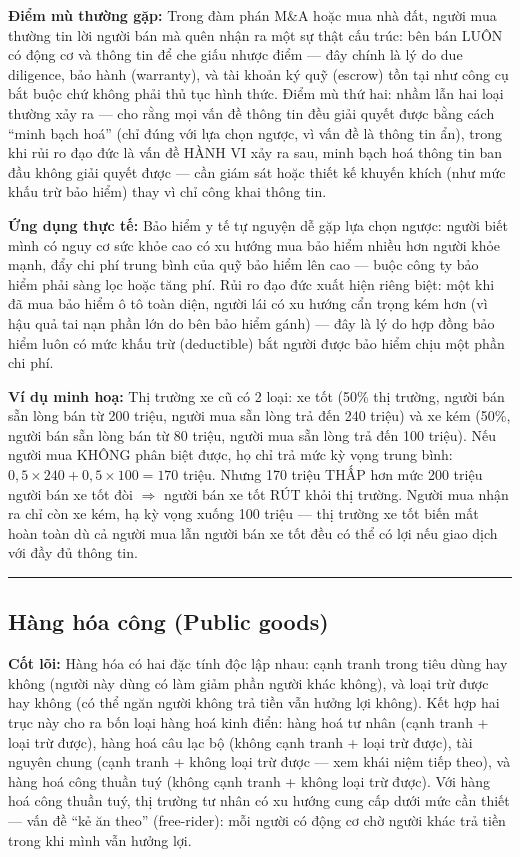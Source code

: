 \documentclass[
]{article}
\begin{document}
\textbf{Điểm mù thường gặp:} Trong đàm phán M\&A hoặc mua nhà đất, người
mua thường tin lời người bán mà quên nhận ra một sự thật cấu trúc: bên
bán LUÔN có động cơ và thông tin để che giấu nhược điểm --- đây chính là
lý do due diligence, bảo hành (warranty), và tài khoản ký quỹ (escrow)
tồn tại như công cụ bắt buộc chứ không phải thủ tục hình thức. Điểm mù
thứ hai: nhầm lẫn hai loại thường xảy ra --- cho rằng mọi vấn đề thông
tin đều giải quyết được bằng cách ``minh bạch hoá'' (chỉ đúng với lựa
chọn ngược, vì vấn đề là thông tin ẩn), trong khi rủi ro đạo đức là vấn
đề HÀNH VI xảy ra sau, minh bạch hoá thông tin ban đầu không giải quyết
được --- cần giám sát hoặc thiết kế khuyến khích (như mức khấu trừ bảo
hiểm) thay vì chỉ công khai thông tin.

\textbf{Ứng dụng thực tế:} Bảo hiểm y tế tự nguyện dễ gặp lựa chọn
ngược: người biết mình có nguy cơ sức khỏe cao có xu hướng mua bảo hiểm
nhiều hơn người khỏe mạnh, đẩy chi phí trung bình của quỹ bảo hiểm lên
cao --- buộc công ty bảo hiểm phải sàng lọc hoặc tăng phí. Rủi ro đạo
đức xuất hiện riêng biệt: một khi đã mua bảo hiểm ô tô toàn diện, người
lái có xu hướng cẩn trọng kém hơn (vì hậu quả tai nạn phần lớn do bên
bảo hiểm gánh) --- đây là lý do hợp đồng bảo hiểm luôn có mức khấu trừ
(deductible) bắt người được bảo hiểm chịu một phần chi phí.

\textbf{Ví dụ minh hoạ:} Thị trường xe cũ có 2 loại: xe tốt (50\% thị
trường, người bán sẵn lòng bán từ 200 triệu, người mua sẵn lòng trả đến
240 triệu) và xe kém (50\%, người bán sẵn lòng bán từ 80 triệu, người
mua sẵn lòng trả đến 100 triệu). Nếu người mua KHÔNG phân biệt được, họ
chỉ trả mức kỳ vọng trung bình:
\(0{,}5 \times 240 + 0{,}5 \times 100 = 170\) triệu. Nhưng 170 triệu
THẤP hơn mức 200 triệu người bán xe tốt đòi \(\Rightarrow\) người bán xe
tốt RÚT khỏi thị trường. Người mua nhận ra chỉ còn xe kém, hạ kỳ vọng
xuống 100 triệu --- thị trường xe tốt biến mất hoàn toàn dù cả người mua
lẫn người bán xe tốt đều có thể có lợi nếu giao dịch với đầy đủ thông
tin.

\begin{center}\rule{0.5\linewidth}{0.5pt}\end{center}

\subsection{Hàng hóa công (Public
goods)}\label{huxe0ng-huxf3a-cuxf4ng-public-goods}

\textbf{Cốt lõi:} Hàng hóa có hai đặc tính độc lập nhau: cạnh tranh
trong tiêu dùng hay không (người này dùng có làm giảm phần người khác
không), và loại trừ được hay không (có thể ngăn người không trả tiền vẫn
hưởng lợi không). Kết hợp hai trục này cho ra bốn loại hàng hoá kinh
điển: hàng hoá tư nhân (cạnh tranh + loại trừ được), hàng hoá câu lạc bộ
(không cạnh tranh + loại trừ được), tài nguyên chung (cạnh tranh + không
loại trừ được --- xem khái niệm tiếp theo), và hàng hoá công thuần tuý
(không cạnh tranh + không loại trừ được). Với hàng hoá công thuần tuý,
thị trường tư nhân có xu hướng cung cấp dưới mức cần thiết --- vấn đề
``kẻ ăn theo'' (free-rider): mỗi người có động cơ chờ người khác trả
tiền trong khi mình vẫn hưởng lợi.
\end{document}
